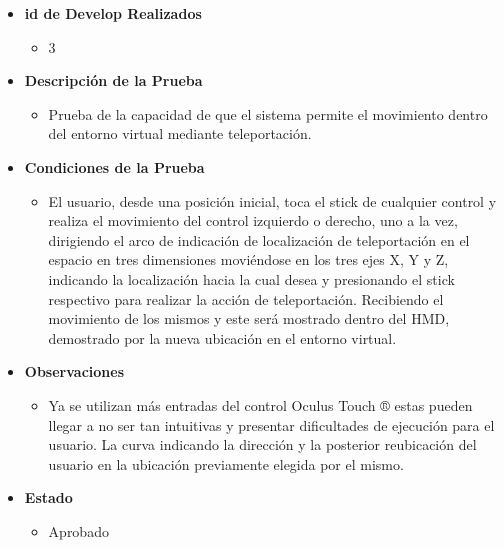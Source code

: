 \begin{itemize}
\begin{figure}[H]
\begin{center}
       	\end{center} 
    \end{figure}
\end{itemize}

\begin{itemize}
    \item \textbf{id de Develop Realizados}
    \begin{itemize}
        \item 3
    \end{itemize}
    \item \textbf{Descripción de la Prueba}
    \begin{itemize}
        \item Prueba de la capacidad de que el sistema permite el movimiento dentro del entorno virtual mediante teleportación.
    \end{itemize}
    \item \textbf{Condiciones de la Prueba}
    \begin{itemize}
        \item 
        El usuario, desde una posición inicial, toca el stick de cualquier control y realiza el movimiento del control izquierdo o derecho, uno a la vez, dirigiendo el arco de indicación de localización de teleportación en el espacio en tres dimensiones moviéndose en los tres ejes X, Y y Z, indicando la localización hacia la cual desea y presionando el stick respectivo para realizar la acción de teleportación. Recibiendo el movimiento de los mismos y este será mostrado dentro del HMD, demostrado por la nueva ubicación en el entorno virtual.\\        
    \end{itemize}
    \item \textbf{Observaciones}
    \begin{itemize}
        \item Ya se utilizan más entradas del control Oculus Touch ® estas pueden llegar a no ser tan intuitivas y presentar dificultades de ejecución para el usuario. La curva indicando la dirección y la posterior reubicación del usuario en la ubicación previamente elegida por el mismo.
    \end{itemize}
    \item \textbf{Estado}
    \begin{itemize}
        \item Aprobado

\end{itemize}
\end{itemize}
